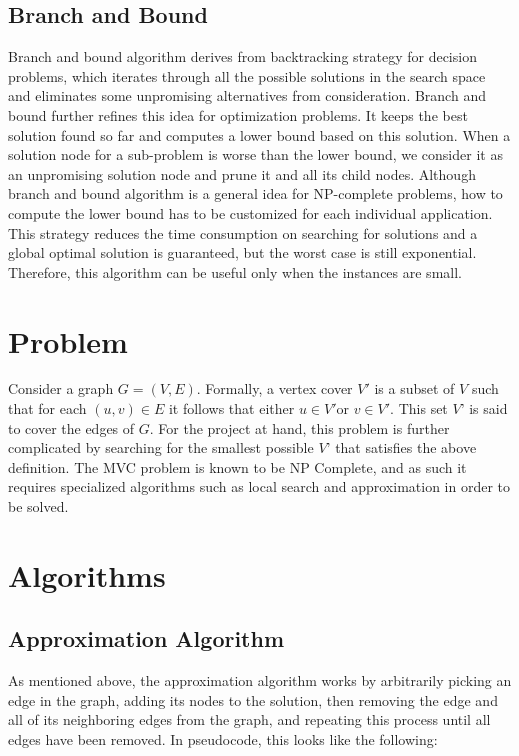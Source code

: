 \subsection{Branch and Bound}
Branch and bound algorithm derives from backtracking strategy for decision problems, which iterates through all the possible solutions in the search space and eliminates some unpromising alternatives from consideration. Branch and bound further refines this idea for optimization problems. It keeps the best solution found so far and computes a lower bound based on this solution. When a solution node for a sub-problem is worse than the lower bound, we consider it as an unpromising solution node and prune it and all its child nodes. Although branch and bound algorithm is a general idea for NP-complete problems, how to compute the lower bound has to be customized for each individual application. This strategy reduces the time consumption on searching for solutions and a global optimal solution is guaranteed, but the worst case is still exponential. Therefore, this algorithm can be useful only when the instances are small.

\section{Problem}
Consider a graph $G=\left( V,E \right)$.  Formally, a vertex cover ${V}'$ is a subset of $V$ such that for each $\left( u,v \right)\in E$ it follows that either $u\in{V}'$or $v\in{V}'$. This set ${V}’$ is said to cover the edges of $G$. For the project at hand, this problem is further complicated by searching for the smallest possible ${V}’$ that satisfies the above definition. The MVC problem is known to be NP Complete, and as such it requires specialized algorithms such as local search and approximation in order to be solved. 

\section{Algorithms}
\subsection{Approximation Algorithm}
As mentioned above, the approximation algorithm works by arbitrarily picking an edge in the graph, adding its nodes to the solution, then removing the edge and all of its neighboring edges from the graph, and repeating this process until all edges have been removed. In pseudocode, this looks like the following:

